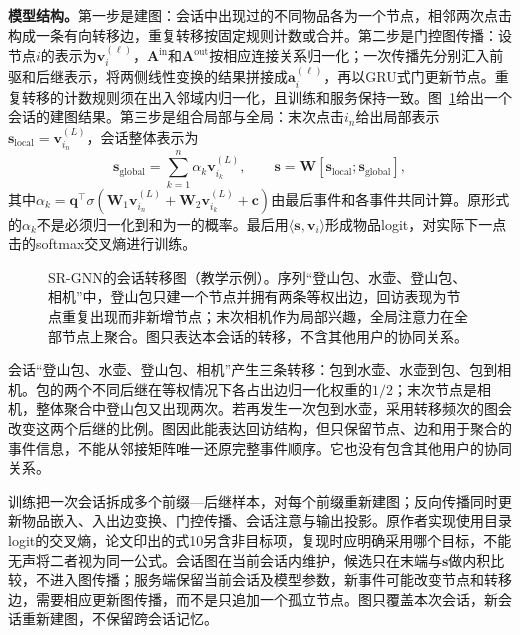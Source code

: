 \textbf{模型结构。}第一步是建图：会话中出现过的不同物品各为一个节点，相邻两次点击构成一条有向转移边，重复转移按固定规则计数或合并。第二步是门控图传播：设节点$i$的表示为$\bm{v}_i^{(\ell)}$，$\bm{A}^{\mathrm{in}}$和$\bm{A}^{\mathrm{out}}$按相应连接关系归一化；一次传播先分别汇入前驱和后继表示，将两侧线性变换的结果拼接成$\bm{a}_i^{(\ell)}$，再以GRU式门更新节点。重复转移的计数规则须在出入邻域内归一化，且训练和服务保持一致。图~\ref{fig:rs-srgnn-graph}给出一个会话的建图结果。第三步是组合局部与全局：末次点击$i_n$给出局部表示$\bm{s}_{\mathrm{local}}=\bm{v}_{i_n}^{(L)}$，会话整体表示为
\begin{equation}
  \bm{s}_{\mathrm{global}}=\sum_{k=1}^{n}\alpha_k\bm{v}_{i_k}^{(L)},
  \qquad
  \bm{s}=\bm{W}
  [\bm{s}_{\mathrm{local}};\bm{s}_{\mathrm{global}}],
  \label{eq:rs-srgnn-session}
\end{equation}
其中$\alpha_k=\bm{q}^{\top}\sigma(\bm{W}_1\bm{v}_{i_n}^{(L)}
+\bm{W}_2\bm{v}_{i_k}^{(L)}+\bm{c})$由最后事件和各事件共同计算。原形式的$\alpha_k$不是必须归一化到和为一的概率。最后用$\langle\bm{s},\bm{v}_i\rangle$形成物品logit，对实际下一点击的softmax交叉熵进行训练。

\begin{figure}[htbp]
  \centering
  
  \caption{SR-GNN的会话转移图（教学示例）。序列“登山包、水壶、登山包、相机”中，登山包只建一个节点并拥有两条等权出边，回访表现为节点重复出现而非新增节点；末次相机作为局部兴趣，全局注意力在全部节点上聚合。图只表达本会话的转移，不含其他用户的协同关系。}
  \label{fig:rs-srgnn-graph}
\end{figure}

会话“登山包、水壶、登山包、相机”产生三条转移：包到水壶、水壶到包、包到相机。包的两个不同后继在等权情况下各占出边归一化权重的$1/2$；末次节点是相机，整体聚合中登山包又出现两次。若再发生一次包到水壶，采用转移频次的图会改变这两个后继的比例。图因此能表达回访结构，但只保留节点、边和用于聚合的事件信息，不能从邻接矩阵唯一还原完整事件顺序。它也没有包含其他用户的协同关系。

训练把一次会话拆成多个前缀—后继样本，对每个前缀重新建图；反向传播同时更新物品嵌入、入出边变换、门控传播、会话注意与输出投影。原作者实现使用目录logit的交叉熵，论文印出的式10另含非目标项，复现时应明确采用哪个目标，不能无声将二者视为同一公式。会话图在当前会话内维护，候选只在末端与$\bm{s}$做内积比较，不进入图传播；服务端保留当前会话及模型参数，新事件可能改变节点和转移边，需要相应更新图传播，而不是只追加一个孤立节点。图只覆盖本次会话，新会话重新建图，不保留跨会话记忆。

